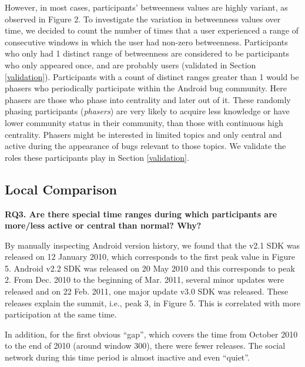 \documentclass[conference]{IEEEtran}
\begin{document}
However, in most cases, participants' betweenness values are
highly variant, as observed in Figure 2. 
To investigate the variation in betweenness values over time, we
decided to count the number of times that a user experienced a range of consecutive windows in
which the user had non-zero betweenness.
Participants who only had 1
distinct range of betweenness are considered to be participants who
only appeared once, and are probably users (validated in Section \ref{validation}). 
Participants with a count of distinct ranges
 greater than 1 would be phasers who periodically participate within
 the Android bug
community. Here phasers are those who
phase into centrality and later out of it.
These randomly phasing participants (\emph{phasers}) are very likely to
acquire less knowledge or have lower community status in their
community, than those with continuous high centrality. 
Phasers
might be interested in limited topics and only central and active
during the appearance of bugs relevant to those topics.
We validate the roles these participants play in Section \ref{validation}.

\subsection{Local Comparison}
\label{local}

\textbf{RQ3. Are there special time ranges during which participants are more/less active or central than normal? Why?}

By manually inspecting Android version history, we found that the v2.1
SDK was released on 12 January 2010, which corresponds to the first peak
value in Figure 5. Android v2.2 SDK was released on 20 May 2010 and this
corresponds to peak 2. From Dec. 2010 to the beginning of Mar. 2011,
several minor updates were released and on 22 Feb. 2011, one major
update v3.0 SDK was released. These releases explain the summit, i.e.,
peak 3, in  Figure 5. This is correlated with more participation at
the same time.

In addition, for the first obvious ``gap'', which covers the time from
October 2010 to the end of 2010 (around window 300), there were fewer
releases. The social network during this time period is almost inactive
and even ``quiet''.
\end{document}
